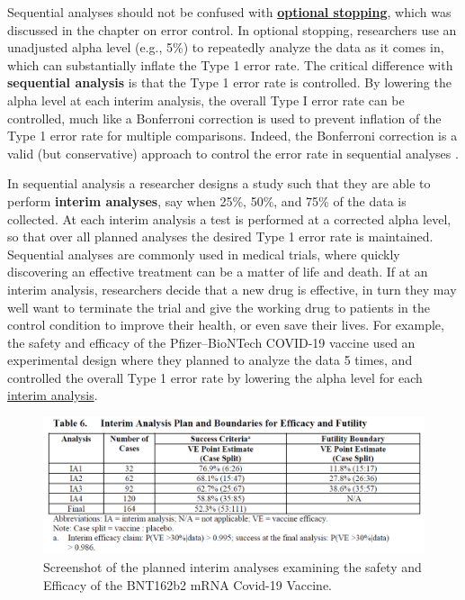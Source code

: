 \documentclass[
  oneside]{krantz}
\begin{document}
Sequential analyses should not be confused with \protect\hyperlink{optionalstopping}{\textbf{optional stopping}}, which was discussed in the chapter on error control. In optional stopping, researchers use an unadjusted alpha level (e.g., 5\%) to repeatedly analyze the data as it comes in, which can substantially inflate the Type 1 error rate. The critical difference with \textbf{sequential analysis} is that the Type 1 error rate is controlled. By lowering the alpha level at each interim analysis, the overall Type I error rate can be controlled, much like a Bonferroni correction is used to prevent inflation of the Type 1 error rate for multiple comparisons. Indeed, the Bonferroni correction is a valid (but conservative) approach to control the error rate in sequential analyses \citep{wassmer_group_2016}.

In sequential analysis a researcher designs a study such that they are able to perform \textbf{interim analyses}, say when 25\%, 50\%, and 75\% of the data is collected. At each interim analysis a test is performed at a corrected alpha level, so that over all planned analyses the desired Type 1 error rate is maintained. Sequential analyses are commonly used in medical trials, where quickly discovering an effective treatment can be a matter of life and death. If at an interim analysis, researchers decide that a new drug is effective, in turn they may well want to terminate the trial and give the working drug to patients in the control condition to improve their health, or even save their lives. For example, the safety and efficacy of the Pfizer--BioNTech COVID-19 vaccine used an experimental design where they planned to analyze the data 5 times, and controlled the overall Type 1 error rate by lowering the alpha level for each \href{https://www.nejm.org/doi/suppl/10.1056/NEJMoa2034577/suppl_file/nejmoa2034577_protocol.pdf}{interim analysis}.

\begin{figure}

{\centering \includegraphics[width=1\linewidth]{images/vaccinetrial} 

}

\caption{Screenshot of the planned interim analyses examining the safety and Efficacy of the BNT162b2 mRNA Covid-19 Vaccine.}\label{fig:interim}
\end{figure}
\end{document}
